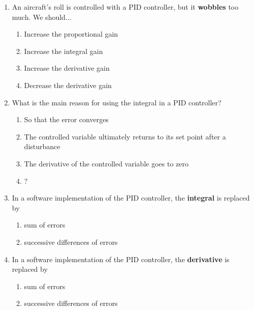 \documentclass[a4paper,10pt,reqno]{amsart}
\numberwithin{equation}{section}
\theoremstyle{plain}
\begin{document}
\begin{enumerate}
  \item An aircraft's roll is controlled with a PID controller, but it \textbf{wobbles}
        too much. We should...
  \begin{enumerate}
   \item Increase the proportional gain
   \item Increase the integral gain
   \item Increase the derivative gain
   \item Decrease the derivative gain
  \end{enumerate}
  
  \item What is the main reason for using the integral in a PID controller?
  \begin{enumerate}
   \item So that the error converges
   \item The controlled variable ultimately returns to its set point after a disturbance 
   \item The derivative of the controlled variable goes to zero
   \item ?
  \end{enumerate}


  \item In a software implementation of the PID controller, the \textbf{integral} 
        is replaced by
  \begin{enumerate}
   \item sum of errors
   \item successive differences of errors
  \end{enumerate}
        
  \item In a software implementation of the PID controller, the \textbf{derivative} 
        is replaced by
  \begin{enumerate}
   \item sum of errors
   \item successive differences of errors
  \end{enumerate}      
\end{enumerate}
\end{document}

